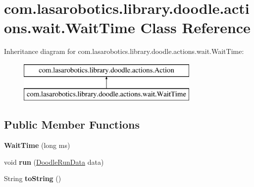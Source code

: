 \hypertarget{classcom_1_1lasarobotics_1_1library_1_1doodle_1_1actions_1_1wait_1_1_wait_time}{}\section{com.\+lasarobotics.\+library.\+doodle.\+actions.\+wait.\+Wait\+Time Class Reference}
\label{classcom_1_1lasarobotics_1_1library_1_1doodle_1_1actions_1_1wait_1_1_wait_time}
Inheritance diagram for com.\+lasarobotics.\+library.\+doodle.\+actions.\+wait.\+Wait\+Time\+:\begin{figure}[H]
\begin{center}
\leavevmode
\includegraphics[height=2.000000cm]{classcom_1_1lasarobotics_1_1library_1_1doodle_1_1actions_1_1wait_1_1_wait_time}
\end{center}
\end{figure}
\subsection*{Public Member Functions}
\begin{DoxyCompactItemize}
\item 
\hypertarget{classcom_1_1lasarobotics_1_1library_1_1doodle_1_1actions_1_1wait_1_1_wait_time_affb23c52be0db8a44e12fedb0aea89b2}{}{\bfseries Wait\+Time} (long ms)\label{classcom_1_1lasarobotics_1_1library_1_1doodle_1_1actions_1_1wait_1_1_wait_time_affb23c52be0db8a44e12fedb0aea89b2}

\item 
\hypertarget{classcom_1_1lasarobotics_1_1library_1_1doodle_1_1actions_1_1wait_1_1_wait_time_aea50c785fa5f5f55d1d274173f858f39}{}void {\bfseries run} (\hyperlink{classcom_1_1lasarobotics_1_1library_1_1doodle_1_1_doodle_run_data}{Doodle\+Run\+Data} data)\label{classcom_1_1lasarobotics_1_1library_1_1doodle_1_1actions_1_1wait_1_1_wait_time_aea50c785fa5f5f55d1d274173f858f39}

\item 
\hypertarget{classcom_1_1lasarobotics_1_1library_1_1doodle_1_1actions_1_1wait_1_1_wait_time_a9705fce43d879bb2e04661934a3b2bda}{}String {\bfseries to\+String} ()\label{classcom_1_1lasarobotics_1_1library_1_1doodle_1_1actions_1_1wait_1_1_wait_time_a9705fce43d879bb2e04661934a3b2bda}

\end{DoxyCompactItemize}
